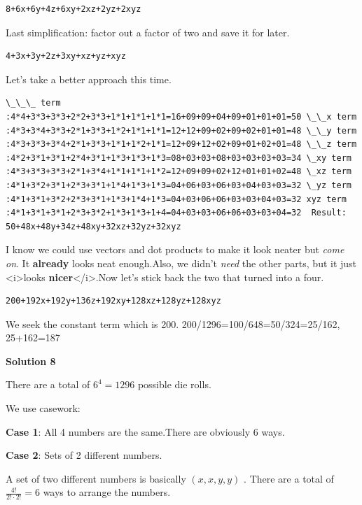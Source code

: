 \begin{enumerate}
 \begin{verbatim}
8+6x+6y+4z+6xy+2xz+2yz+2xyz
\end{verbatim}

Last simplification: factor out a factor of two and save it for later. 

 \begin{verbatim}
4+3x+3y+2z+3xy+xz+yz+xyz
\end{verbatim}

Let's take a better approach this time.

 \begin{verbatim}
\_\_\_ term :4*4+3*3+3*3+2*2+3*3+1*1+1*1+1*1=16+09+09+04+09+01+01+01=50 \_\_x term :4*3+3*4+3*3+2*1+3*3+1*2+1*1+1*1=12+12+09+02+09+02+01+01=48 \_\_y term :4*3+3*3+3*4+2*1+3*3+1*1+1*2+1*1=12+09+12+02+09+01+02+01=48 \_\_z term :4*2+3*1+3*1+2*4+3*1+1*3+1*3+1*3=08+03+03+08+03+03+03+03=34 \_xy term :4*3+3*3+3*3+2*1+3*4+1*1+1*1+1*2=12+09+09+02+12+01+01+02=48 \_xz term :4*1+3*2+3*1+2*3+3*1+1*4+1*3+1*3=04+06+03+06+03+04+03+03=32 \_yz term :4*1+3*1+3*2+2*3+3*1+1*3+1*4+1*3=04+03+06+06+03+03+04+03=32 xyz term :4*1+3*1+3*1+2*3+3*2+1*3+1*3+1+4=04+03+03+06+06+03+03+04=32  Result: 50+48x+48y+34z+48xy+32xz+32yz+32xyz
\end{verbatim}

I know we could use vectors and dot products to make it look neater but \textit{come on}. It \textbf{already} looks neat enough.Also, we didn't \textit{need} the other parts, but it just <i>looks \textbf{nicer}</i>.Now let's stick back the two that turned into a four.

 \begin{verbatim}
200+192x+192y+136z+192xy+128xz+128yz+128xyz
\end{verbatim}

We seek the constant term which is 200. 200/1296=100/648=50/324=25/162, 25+162=187

 



\textbf{Solution 8}

There are a total of $6^4=1296$ possible die rolls.

 
We use casework:

 
\textbf{Case 1}: All 4 numbers are the same.There are obviously $6$ ways.

 
\textbf{Case 2}: Sets of 2 different numbers.

 A set of two different numbers is basically $(x,x,y,y)$ . There are a total of  $\frac{4!}{2!\cdot 2!}=6$ ways to arrange the numbers. 


\end{enumerate}
